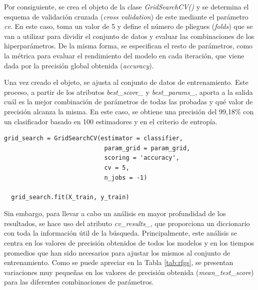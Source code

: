 \vspace{3mm}

Por consiguiente, se crea el objeto de la clase \textit{GridSearchCV()} y se determina el esquema de validación cruzada (\textit{cross validation}) de este mediante el parámetro \textit{cv}. En este caso, toma un valor de 5 y define el número de pliegues (\textit{folds}) que se van a utilizar para dividir el conjunto de datos y evaluar las combinaciones de los hiperparámetros. De la misma forma, se especifican el resto de parámetros, como la métrica para evaluar el rendimiento del modelo en cada iteración, que viene dada por la precisión global obtenida (\textit{accuracy}). 

\vspace{3mm}

Una vez creado el objeto, se ajusta al conjunto de datos de entrenamiento. Este proceso, a partir de los atributos \textit{best\_score\_} y \textit{best\_params\_}, aporta a la salida cuál es la mejor combinación de parámetros de todas las probadas y qué valor de precisión alcanza la misma. En este caso, se obtiene una precisión del 99,18\% con un clasificador basado en 100 estimadores y en el criterio de entropía. 

\vspace{3mm}

\begin{lstlisting}[style=Python, caption={Construcción del objeto \textit{GridSearchCV()}}]
  grid_search = GridSearchCV(estimator = classifier,
                            param_grid = param_grid,
                            scoring = 'accuracy',
                            cv = 5,
                            n_jobs = -1)

  grid_search.fit(X_train, y_train)
\end{lstlisting}

\vspace{3mm}

Sin embargo, para llevar a cabo un análisis en mayor profundidad de los resultados, se hace uso del atributo \textit{cv\_results\_}, que proporciona un diccionario con toda la información útil de la búsqueda. Principalmente, este análisis se centra en los valores de precisión obtenidos de todos los modelos y en los tiempos promedios que han sido necesarios para ajustar los mismos al conjunto de entrenamiento. Como se puede apreciar en la Tabla \ref{tab:rfgs}, se presentan variaciones muy pequeñas en los valores de precisión obtenida (\textit{mean\_test\_score}) para las diferentes combinaciones de parámetros.

